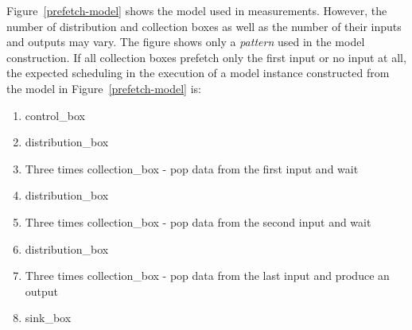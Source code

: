 Figure~\ref{prefetch-model} shows the model used in measurements. However, the number of distribution and collection boxes as well as the number of their inputs and outputs may vary. The figure shows only a \emph{pattern} used in the model construction. If all collection boxes prefetch only the first input or no input at all, the expected scheduling in the execution of a model instance constructed from the model in Figure~\ref{prefetch-model} is:

\begin{enumerate}
\item{control\_box}
\item{distribution\_box}
\item{Three times collection\_box - pop data from the first input and wait}
\item{distribution\_box}
\item{Three times collection\_box - pop data from the second input and wait}
\item{distribution\_box}
\item{Three times collection\_box - pop data from the last input and produce an output}
\item{sink\_box}
\end{enumerate}


